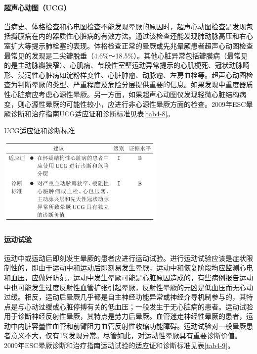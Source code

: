 \paragraph{超声心动图（UCG）}

当病史、体格检查和心电图检查不能发现晕厥的原因时，超声心动图检查是发现包括瓣膜病在内的器质性心脏病的有效方法。通过该检查还能发现肺动脉高压和右心室扩大等提示肺栓塞的表现。体格检查正常的晕厥或先兆晕厥患者超声心动图检查最常见的发现是二尖瓣脱垂（4.6\%～18.5\%）。其他心脏异常包括瓣膜病（最常见的是主动脉瓣狭窄）、心肌病、节段性室壁运动异常提示的心肌梗死、冠状动脉畸形、浸润性心脏病如淀粉样变性、心脏肿瘤、动脉瘤、左房血栓等。超声心动图检查为判断晕厥的类型、严重程度及危险分层提供重要的信息。如果发现中重度器质性心脏病应考虑心源性晕厥。另一方面，如果超声心动图仪发现轻微心脏结构病变，则心源性晕厥的可能性较小，应进行非心源性晕厥方面的检查。2009年ESC晕厥诊断和治疗指南UCG适应证和诊断标准见表\ref{tab4-8}。

\begin{table}[htbp]
\centering
\caption{UCG适应证和诊断标准}
\label{tab4-8}
\includegraphics[width=3.20833in,height=1.6875in]{./images/Image00025.jpg}
\end{table}

\paragraph{运动试验}

运动中或运动后即刻发生晕厥的患者应进行运动试验。进行运动试验应该是症状限制性的，即由于运动中和运动后即刻易发生晕厥，运动中和恢复阶段均应监测心电和血压，应做好防范。运动中发生晕厥可能是心脏原因造成的，有些病例报告运动中也可能发生过度反射性血管扩张引起晕厥，反射性晕厥的元凶是低血压而无心动过缓。相反，运动后晕厥几乎都是自主神经功能异常或神经介导机制参与的，其特点是与心动过缓或心脏停搏有关的低血压；一般发生于无心脏病的患者。运动试验用于诊断神经反射性晕厥，其特点是劳力后晕厥。血管迷走神经性晕厥的患者，运动中内脏容量性血管和前臂阻力血管反射性收缩功能障碍。运动试验对一般晕厥患者意义不大，仅有1\%发现异常。尽管如此，对运动性晕厥具有重要诊断价值。2009年ESC晕厥诊断和治疗指南运动试验的适应证和诊断标准见表\ref{tab4-9}。

